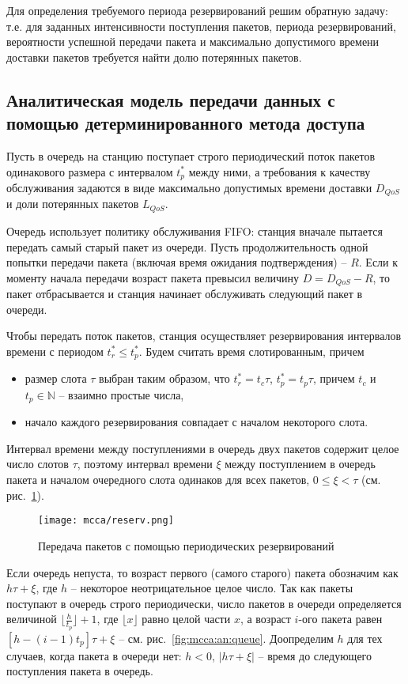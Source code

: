 Для определения требуемого периода резервирований решим обратную задачу: т.е. для заданных интенсивности поступления пакетов, периода резервирований,  вероятности успешной передачи пакета и максимально допустимого времени доставки пакетов требуется найти  долю потерянных пакетов.

\subsection{Аналитическая модель передачи данных с помощью детерминированного метода доступа}
Пусть в очередь на станцию поступает строго периодический поток пакетов одинакового размера с интервалом $t_p^*$ между ними, а требования к качеству обслуживания задаются в виде максимально допустимых времени доставки $D_{QoS}$ и доли потерянных пакетов $L_{QoS}$.

Очередь использует политику обслуживания FIFO: станция вначале пытается передать самый старый пакет из очереди. Пусть продолжительность одной попытки передачи пакета (включая время ожидания подтверждения) -- $R$. Если к моменту начала передачи возраст пакета превысил величину $D = D_{QoS} - R$, то пакет отбрасывается и станция начинает обслуживать следующий пакет в очереди.

Чтобы передать поток пакетов, станция осуществляет резервирования интервалов времени с периодом $t_r^* \leq t_p^*$. Будем считать время слотированным, причем
\begin{itemize}
  \item размер слота $\tau$ выбран таким образом, что $t_r^*  = t_c \tau $,  $t_p^* = t_p \tau$, причем $t_c$ и $t_p \in \mathbb{N}$ -- взаимно простые числа,
  \item начало каждого резервирования совпадает с началом некоторого слота.
\end{itemize}

Интервал времени между поступлениями в очередь двух пакетов содержит целое число слотов $\tau$, поэтому интервал времени $\xi$ между поступлением в очередь пакета и началом очередного слота одинаков для всех пакетов, $0 \leq \xi < \tau$ (см. рис.~\ref{fig:mcca:an:send}).

\begin{figure}
\centering
     \texttt{[image: mcca/reserv.png]} \\
    \caption{\label{fig:mcca:an:send} Передача пакетов с помощью периодических резервирований}
\end{figure}

Если очередь непуста, то возраст первого (самого старого) пакета обозначим как $h \tau+\xi$, где $h$ -- некоторое неотрицательное целое число. Так как пакеты поступают  в очередь строго периодически, число пакетов в очереди определяется величиной $\lfloor\frac{h}{t_p}\rfloor+1$, где $\lfloor x \rfloor$ равно целой части $x$, а возраст $i$-ого пакета равен $[h - (i-1)t_p ]\tau + \xi$ -- см. рис.~\ref{fig:mcca:an:queue}. Доопределим $h$ для тех случаев, когда пакета в очереди нет: $h<0$, $|h \tau+\xi|$ -- время до следующего поступления пакета в очередь.

